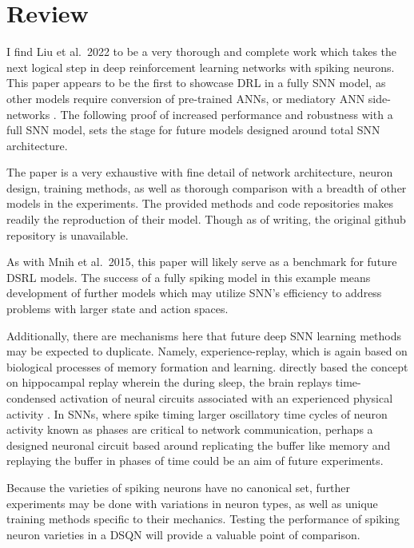 \documentclass[journal,onecolumn]{IEEEtran}
\begin{document}
\section{Review}\label{review}

I find Liu et al.~2022 to be a very thorough and complete work which
takes the next logical step in deep reinforcement learning networks with
spiking neurons. This paper appears to be the first to showcase DRL in a
fully SNN model, as other models require conversion of pre-trained
ANNs, or mediatory ANN side-networks
\autocite{chenDeepReinforcementLearning2022}. The following
proof of increased performance and robustness with a full SNN model,
sets the stage for future models designed around total SNN architecture.

The paper is a very exhaustive with fine detail of network architecture,
neuron design, training methods, as well as thorough comparison with a
breadth of other models in the experiments. The provided methods and
code repositories makes readily the reproduction of their model. Though
as of writing, the original github repository is unavailable.

As with Mnih et al.~2015, this paper will likely serve as a benchmark for future DSRL models. The success of a fully spiking model in this example means development of further models which may
utilize SNN's efficiency to address problems with larger state and
action spaces.

Additionally, there are mechanisms here that future deep SNN learning
methods may be expected to duplicate. Namely, experience-replay, which
is again based on biological processes of memory formation and learning.
\autocite{mnihHumanlevelControlDeep2015} directly based the concept on
hippocampal replay wherein the during sleep, the brain replays
time-condensed activation of neural circuits associated with an
experienced physical activity
\autocite{bendorBiasingContentHippocampal2012}\autocite{oneillPlayItAgain2010}.
In SNNs, where spike timing larger oscillatory time cycles of neuron
activity known as phases are critical to network communication, perhaps
a designed neuronal circuit based around replicating the buffer like
memory and replaying the buffer in phases of time could be an aim of
future experiments.

Because the varieties of spiking neurons have no canonical set, further
experiments may be done with variations in neuron types, as well as
unique training methods specific to their mechanics. Testing the performance of spiking neuron varieties in a DSQN will provide a valuable point of comparison.
\end{document}
